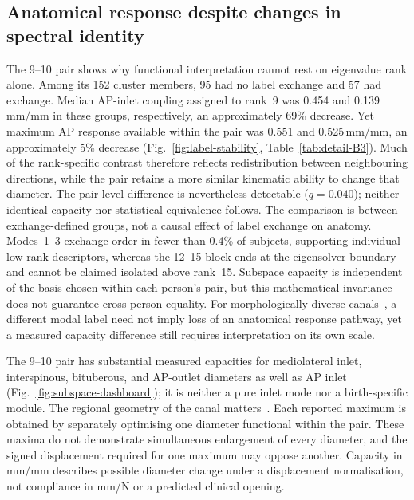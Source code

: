 \documentclass[pdflatex,sn-basic]{sn-jnl}
\begin{document}
\subsection{Anatomical response despite changes in spectral identity}
The 9--10 pair shows why functional interpretation cannot rest on eigenvalue rank alone. Among its 152 cluster members, 95 had no label exchange and 57 had exchange. Median AP-inlet coupling assigned to rank~9 was 0.454 and 0.139\,mm/mm in these groups, respectively, an approximately 69\% decrease. Yet maximum AP response available within the pair was 0.551 and 0.525\,mm/mm, an approximately 5\% decrease (Fig.~\ref{fig:label-stability}, Table~\ref{tab:detail-B3}). Much of the rank-specific contrast therefore reflects redistribution between neighbouring directions, while the pair retains a more similar kinematic ability to change that diameter. The pair-level difference is nevertheless detectable ($q=0.040$); neither identical capacity nor statistical equivalence follows. The comparison is between exchange-defined groups, not a causal effect of label exchange on anatomy. Modes~1--3 exchange order in fewer than 0.4\% of subjects, supporting individual low-rank descriptors, whereas the 12--15 block ends at the eigensolver boundary and cannot be claimed isolated above rank~15. Subspace capacity is independent of the basis chosen within each person's pair, but this mathematical invariance does not guarantee cross-person equality. For morphologically diverse canals~\citep{BettiManica2018}, a different modal label need not imply loss of an anatomical response pathway, yet a measured capacity difference still requires interpretation on its own scale.

The 9--10 pair has substantial measured capacities for mediolateral inlet, interspinous, bituberous, and AP-outlet diameters as well as AP inlet (Fig.~\ref{fig:subspace-dashboard}); it is neither a pure inlet mode nor a birth-specific module. The regional geometry of the canal matters~\citep{StansfieldCanal2021}. Each reported maximum is obtained by separately optimising one diameter functional within the pair. These maxima do not demonstrate simultaneous enlargement of every diameter, and the signed displacement required for one maximum may oppose another. Capacity in mm/mm describes possible diameter change under a displacement normalisation, not compliance in mm/N or a predicted clinical opening.
\end{document}

